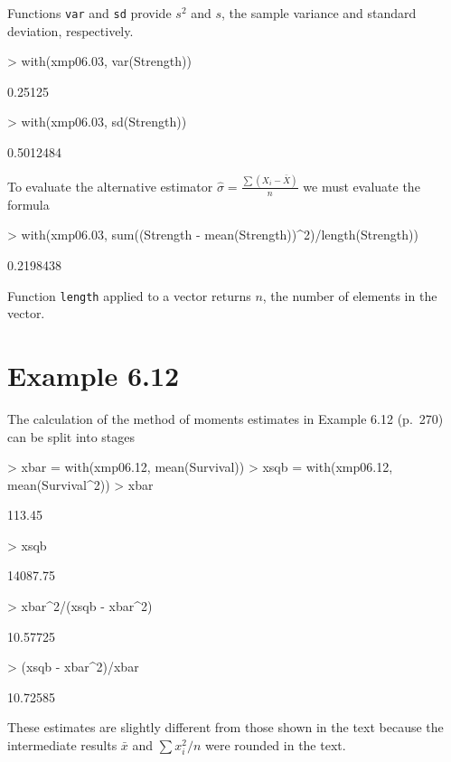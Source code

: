 \documentclass{book}
\begin{document}
Functions \texttt{var} and \texttt{sd} provide $s^2$ and $s$, the
sample variance and standard deviation, respectively.
\begin{Schunk}
\begin{Sinput}
> with(xmp06.03, var(Strength))
\end{Sinput}
\begin{Soutput}
[1] 0.25125
\end{Soutput}
\begin{Sinput}
> with(xmp06.03, sd(Strength))
\end{Sinput}
\begin{Soutput}
[1] 0.5012484
\end{Soutput}
\end{Schunk}
To evaluate the alternative estimator
$\hat{\sigma}=\frac{\sum\left(X_i-\bar{X}\right)}{n}$ we must evaluate
the formula
\begin{Schunk}
\begin{Sinput}
> with(xmp06.03, sum((Strength - mean(Strength))^2)/length(Strength))
\end{Sinput}
\begin{Soutput}
[1] 0.2198438
\end{Soutput}
\end{Schunk}
Function \texttt{length} applied to a vector returns $n$, the number
of elements in the vector.


\section{Example 6.12}
\label{sec:xmp0612}

The calculation of the method of moments estimates in Example 6.12
(p.~270) can be split into stages
\begin{Schunk}
\begin{Sinput}
> xbar = with(xmp06.12, mean(Survival))
> xsqb = with(xmp06.12, mean(Survival^2))
> xbar
\end{Sinput}
\begin{Soutput}
[1] 113.45
\end{Soutput}
\begin{Sinput}
> xsqb
\end{Sinput}
\begin{Soutput}
[1] 14087.75
\end{Soutput}
\begin{Sinput}
> xbar^2/(xsqb - xbar^2)
\end{Sinput}
\begin{Soutput}
[1] 10.57725
\end{Soutput}
\begin{Sinput}
> (xsqb - xbar^2)/xbar
\end{Sinput}
\begin{Soutput}
[1] 10.72585
\end{Soutput}
\end{Schunk}
These estimates are slightly different from those shown in the text
because the intermediate results $\bar{x}$ and $\sum x_i^2/n$ were
rounded in the text.
\end{document}
